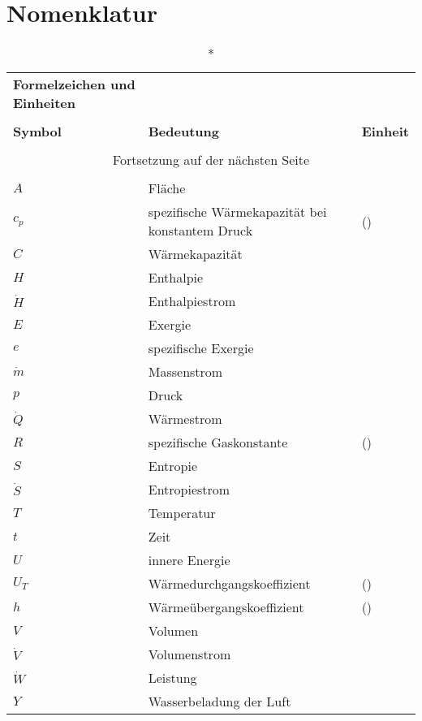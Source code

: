 \chapter*{Nomenklatur}
\begin{onehalfspacing}
\begin{longtable}[h]{p{} p{} p{}}
		\caption*{\textbf{Formelzeichen und Einheiten}} \\
		\\
		\textbf{Symbol} & \textbf{Bedeutung} & \textbf{Einheit} \\ %
		\endhead
		\\
		\multicolumn{3}{c}{Fortsetzung auf der nächsten Seite} \\
		\endfoot
		\multicolumn{3}{c}{ } \\
		\endlastfoot
		
		$A$ & Fläche & \squaremetre\\
		$c_{p}$&spezifische Wärmekapazität bei konstantem Druck&\joule\per(\kilogram\usk\kelvin)\\
			$C$&Wärmekapazität&\watt\per\kilogram\\
		$H $ & Enthalpie & \joule\\		
		$\dot{H}$ & Enthalpiestrom & \joule\per\second\\
		$E$ & Exergie & \joule\\
		$e$ & spezifische Exergie & \joule\per\kilogram\\
		$\dot{m}$ & Massenstrom & \kilogram\per\second\\
		$p$ & Druck & \pascal\\
		$\dot{Q}$ & Wärmestrom & \watt\\
		$R$ & spezifische Gaskonstante & \joule\per(\kilogram\usk\kelvin)\\
		$S$ & Entropie & \joule\per\kelvin\\
		$\dot{S}$ & Entropiestrom & \watt\per\kelvin\\
		$T$ & Temperatur & \kelvin\\
		$t$ & Zeit & \second\\
		$U$ & innere Energie & \joule\\
		$U_{T}$ & Wärmedurchgangskoeffizient & \watt\per(\kilogram\usk\kelvin)\\
		$h$ & Wärmeübergangskoeffizient & \watt\per(\squaremetre\usk\kelvin)\\		
		$V$ & Volumen & \cubic\meter\\
		$\dot{V}$&Volumenstrom&\cubic\meter\per\second\\
		$\dot{W}$ & Leistung & \watt\\
		$Y$ & Wasserbeladung der Luft & \gram\per\kilogram\\
		

\end{longtable}
\end{onehalfspacing}
